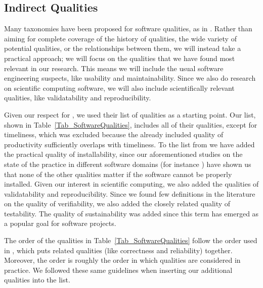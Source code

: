 \documentclass[letterpaper, cleveref]{lipics-v2019}
\theoremstyle{definition}
\begin{document}
\subsection{Indirect Qualities} \label{Sec_IndirectQualities}

Many taxonomies have been proposed for software qualities, as in
\citet{McCallEtAl1977, boehm1976quantitative, ISO9126}. Rather than aiming for
complete coverage of the history of qualities, the wide variety of potential
qualities, or the relationships between them, we will instead take a practical
approach; we will focus on the qualities that we have found most relevant in our
research.  This means we will include the usual software engineering suspects,
like usability and maintainability.  Since we also do research on scientific
computing software, we will also include scientifically relevant qualities, like
validatability and reproducibility.

Given our respect for \citet[p.\ 15--33]{GhezziEtAl2003}, we used their list of
qualities as a starting point. Our list, shown in
Table~\ref{Tab_SoftwareQualities}, includes all of their qualities, except for
timeliness, which was excluded because the already included quality of
productivity sufficiently overlaps with timeliness.  To the list from
\citet{GhezziEtAl2003} we have added the practical quality of installability,
since our aforementioned studies on the state of the practice in different
software domains (for instance \citet{SmithEtAl2018_arXivGIS}) have shown us
that none of the other qualities matter if the software cannot be properly
installed.  Given our interest in scientific computing, we also added the
qualities of validatability and reproducibility. Since we found few definitions
in the literature on the quality of verifiability, we also added the closely
related quality of testability.  The quality of sustainability was added since
this term has emerged as a popular goal for software projects.

The order of the qualities in Table~\ref{Tab_SoftwareQualities} follow the order
used in \cite{GhezziEtAl2003}, which puts related qualities (like correctness
and reliability) together.  Moreover, the order is roughly the order in which
qualities are considered in practice.  We followed these same guidelines when
inserting our additional qualities into the list.
\end{document}
